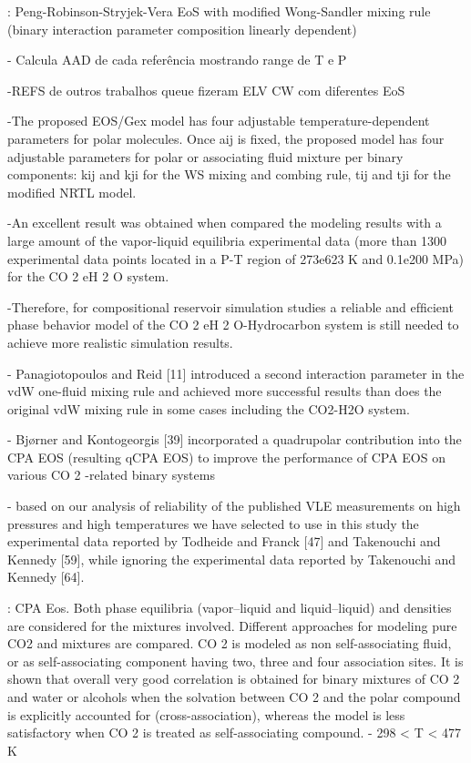 
\cite{Zhao2016} : Peng-Robinson-Stryjek-Vera EoS with modified Wong-Sandler mixing rule (binary interaction parameter composition linearly dependent)

- Calcula AAD de cada referência mostrando range de T e P

-REFS de outros trabalhos queue fizeram ELV CW com diferentes EoS

-The proposed EOS/Gex model has four adjustable temperature-dependent parameters for polar molecules. Once aij is ﬁxed, the proposed model has four adjustable parameters for polar or associating ﬂuid mixture per binary components: kij and kji for the WS mixing and combing rule, tij and tji for
the modiﬁed NRTL model.

-An excellent result was obtained when compared the modeling results with a large amount of the vapor-liquid equilibria experimental data (more than 1300
experimental data points located in a P-T region of 273e623 K and 0.1e200 MPa) for the CO 2 eH 2 O system.

-Therefore, for compositional reservoir simulation studies a reliable and efﬁcient phase behavior model of the CO 2 eH 2 O-Hydrocarbon system is still needed to achieve more realistic simulation results.

- Panagiotopoulos and Reid [11] introduced a second interaction parameter in the vdW one-ﬂuid mixing rule and achieved more successful results than does the original vdW mixing rule in some cases including the CO2-H2O system.

- Bjørner and Kontogeorgis [39] incorporated a quadrupolar contribution into the CPA EOS (resulting qCPA EOS) to improve the performance of CPA EOS on various CO 2 -related binary systems

- based on our analysis of reliability of the published VLE measurements on high pressures and high temperatures we have selected to use in this study the  experimental data reported by  Todheide and Franck [47] and Takenouchi and Kennedy [59], while ignoring the experimental data reported by Takenouchi and Kennedy [64].




\cite{Tsivintzelis2011}: CPA Eos. Both phase equilibria (vapor–liquid and liquid–liquid) and densities are considered for the mixtures involved. Different approaches for modeling pure CO2 and mixtures are compared. CO 2 is modeled as non self-associating ﬂuid, or as self-associating component having two,
three and four association sites. It is shown that overall very good correlation is obtained for binary mixtures of CO 2 and water or alcohols when the solvation between CO 2 and the polar compound is explicitly accounted for (cross-association), whereas the model is less satisfactory when CO 2 is treated as self-associating compound. - 298 < T < 477 K

